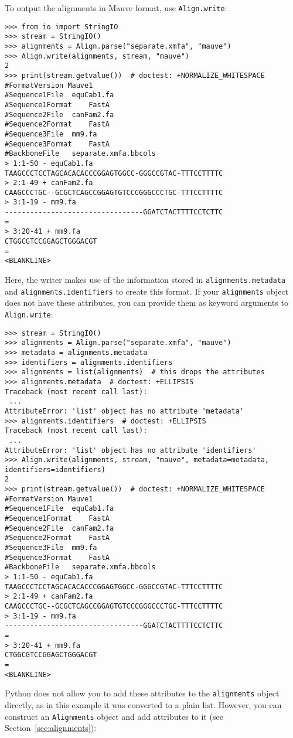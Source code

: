 To output the alignments in Mauve format, use \verb|Align.write|:
\begin{verbatim}
>>> from io import StringIO
>>> stream = StringIO()
>>> alignments = Align.parse("separate.xmfa", "mauve")
>>> Align.write(alignments, stream, "mauve")
2
>>> print(stream.getvalue())  # doctest: +NORMALIZE_WHITESPACE
#FormatVersion Mauve1
#Sequence1File	equCab1.fa
#Sequence1Format	FastA
#Sequence2File	canFam2.fa
#Sequence2Format	FastA
#Sequence3File	mm9.fa
#Sequence3Format	FastA
#BackboneFile	separate.xmfa.bbcols
> 1:1-50 - equCab1.fa
TAAGCCCTCCTAGCACACACCCGGAGTGGCC-GGGCCGTAC-TTTCCTTTTC
> 2:1-49 + canFam2.fa
CAAGCCCTGC--GCGCTCAGCCGGAGTGTCCCGGGCCCTGC-TTTCCTTTTC
> 3:1-19 - mm9.fa
---------------------------------GGATCTACTTTTCCTCTTC
=
> 3:20-41 + mm9.fa
CTGGCGTCCGGAGCTGGGACGT
=
<BLANKLINE>
\end{verbatim}
Here, the writer makes use of the information stored in \verb+alignments.metadata+ and \verb+alignments.identifiers+ to create this format.
If your \verb|alignments| object does not have these attributes, you can provide them as keyword arguments to \verb+Align.write+:
\begin{verbatim}
>>> stream = StringIO()
>>> alignments = Align.parse("separate.xmfa", "mauve")
>>> metadata = alignments.metadata
>>> identifiers = alignments.identifiers
>>> alignments = list(alignments)  # this drops the attributes
>>> alignments.metadata  # doctest: +ELLIPSIS
Traceback (most recent call last):
 ...
AttributeError: 'list' object has no attribute 'metadata'
>>> alignments.identifiers  # doctest: +ELLIPSIS
Traceback (most recent call last):
 ...
AttributeError: 'list' object has no attribute 'identifiers'
>>> Align.write(alignments, stream, "mauve", metadata=metadata, identifiers=identifiers)
2
>>> print(stream.getvalue())  # doctest: +NORMALIZE_WHITESPACE
#FormatVersion Mauve1
#Sequence1File	equCab1.fa
#Sequence1Format	FastA
#Sequence2File	canFam2.fa
#Sequence2Format	FastA
#Sequence3File	mm9.fa
#Sequence3Format	FastA
#BackboneFile	separate.xmfa.bbcols
> 1:1-50 - equCab1.fa
TAAGCCCTCCTAGCACACACCCGGAGTGGCC-GGGCCGTAC-TTTCCTTTTC
> 2:1-49 + canFam2.fa
CAAGCCCTGC--GCGCTCAGCCGGAGTGTCCCGGGCCCTGC-TTTCCTTTTC
> 3:1-19 - mm9.fa
---------------------------------GGATCTACTTTTCCTCTTC
=
> 3:20-41 + mm9.fa
CTGGCGTCCGGAGCTGGGACGT
=
<BLANKLINE>
\end{verbatim}
Python does not allow you to add these attributes to the \verb+alignments+ object directly, as in this example it was converted to a plain list.
However, you can construct an \verb|Alignments| object and add attributes to it (see Section~\ref{sec:alignments}):

